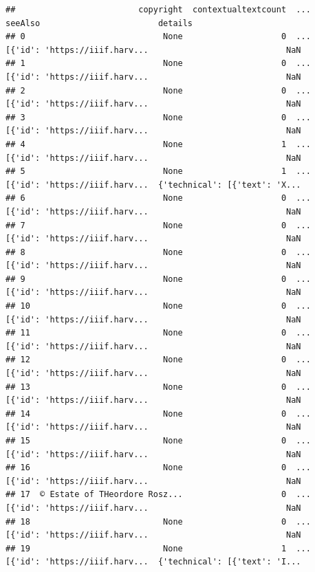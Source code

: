 \documentclass[
]{book}
\begin{document}
\begin{verbatim}
##                         copyright  contextualtextcount  ...                        seeAlso                        details
## 0                            None                    0  ...  [{'id': 'https://iiif.harv...                            NaN
## 1                            None                    0  ...  [{'id': 'https://iiif.harv...                            NaN
## 2                            None                    0  ...  [{'id': 'https://iiif.harv...                            NaN
## 3                            None                    0  ...  [{'id': 'https://iiif.harv...                            NaN
## 4                            None                    1  ...  [{'id': 'https://iiif.harv...                            NaN
## 5                            None                    1  ...  [{'id': 'https://iiif.harv...  {'technical': [{'text': 'X...
## 6                            None                    0  ...  [{'id': 'https://iiif.harv...                            NaN
## 7                            None                    0  ...  [{'id': 'https://iiif.harv...                            NaN
## 8                            None                    0  ...  [{'id': 'https://iiif.harv...                            NaN
## 9                            None                    0  ...  [{'id': 'https://iiif.harv...                            NaN
## 10                           None                    0  ...  [{'id': 'https://iiif.harv...                            NaN
## 11                           None                    0  ...  [{'id': 'https://iiif.harv...                            NaN
## 12                           None                    0  ...  [{'id': 'https://iiif.harv...                            NaN
## 13                           None                    0  ...  [{'id': 'https://iiif.harv...                            NaN
## 14                           None                    0  ...  [{'id': 'https://iiif.harv...                            NaN
## 15                           None                    0  ...  [{'id': 'https://iiif.harv...                            NaN
## 16                           None                    0  ...  [{'id': 'https://iiif.harv...                            NaN
## 17  © Estate of THeordore Rosz...                    0  ...  [{'id': 'https://iiif.harv...                            NaN
## 18                           None                    0  ...  [{'id': 'https://iiif.harv...                            NaN
## 19                           None                    1  ...  [{'id': 'https://iiif.harv...  {'technical': [{'text': 'I...

\end{verbatim}
\end{document}
